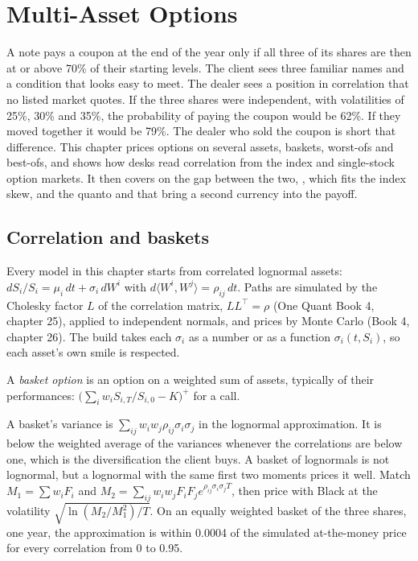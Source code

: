 \chapter{Multi-Asset Options}\label{ch:dv:multi-asset-options}

A note pays a coupon at the end of the year only if all three of its shares are then at or above 70\% of their
starting levels. The client sees three familiar names and a condition that looks easy to meet. The dealer sees a
position in correlation that no listed market quotes. If the three shares were independent, with volatilities of
25\%, 30\% and 35\%, the probability of paying the coupon would be 62\%. If they moved together it would be 79\%. The
dealer who sold the coupon is short that difference. This chapter prices options on several assets, baskets,
worst-ofs and best-ofs, and shows how desks read correlation from the index and single-stock option markets. It
then covers  on the gap between the two, , which fits the index skew, and the
quanto and  that bring a second currency into the payoff.

\section{Correlation and baskets}

Every model in this chapter starts from correlated lognormal assets:
$dS_i/S_i=\mu_i\,dt+\sigma_i\,dW^i$ with $d\langle W^i,W^j\rangle=\rho_{ij}\,dt$. Paths are simulated by the
Cholesky factor $L$ of the correlation matrix, $LL^\top=\rho$ (One Quant Book 4, chapter 25), applied to independent
normals, and prices by Monte Carlo (Book 4, chapter 26). The build takes each $\sigma_i$ as a number or as a  function $\sigma_i(t,S_i)$, so each asset's own smile is respected.

\begin{definition}\label{def:dv:multi-asset-options:basket}
A \emph{basket option} is an option on a weighted sum of assets, typically of their
performances: $\bigl(\sum_iw_iS_{i,T}/S_{i,0}-K\bigr)^+$ for a call.
\end{definition}

A basket's variance is $\sum_{ij}w_iw_j\rho_{ij}\sigma_i\sigma_j$ in the lognormal approximation. It is below the
weighted average of the variances whenever the correlations are below one, which is the diversification the client
buys. A basket of lognormals is not lognormal, but a lognormal with the same first two moments prices it well. Match
$M_1=\sum w_iF_i$ and $M_2=\sum_{ij}w_iw_jF_iF_je^{\rho_{ij}\sigma_i\sigma_jT}$, then price with Black at the volatility
$\sqrt{\ln(M_2/M_1^2)/T}$. On an equally weighted basket of the three shares, one year, the approximation is within
0.0004 of the simulated at-the-money price for every correlation from 0 to 0.95.

